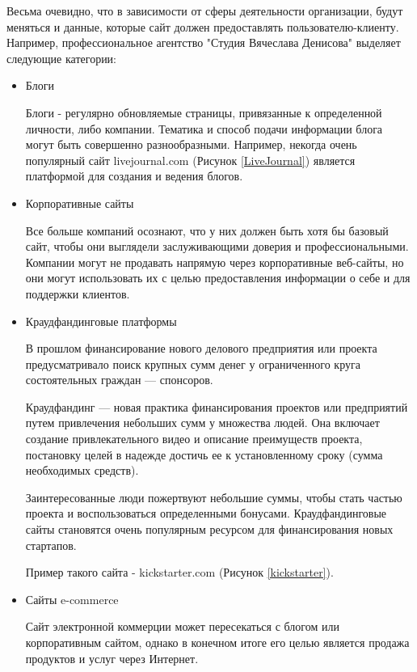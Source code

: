Весьма очевидно, что в зависимости от сферы деятельности организации, будут меняться и данные, которые сайт должен предоставлять пользователю-клиенту.
Например, профессиональное агентство "Студия Вячеслава Денисова" \cite{denisov} выделяет следующие категории:
\begin{itemize}
	\item Блоги
    
    Блоги - регулярно обновляемые страницы, привязанные к определенной личности, либо компании.
	Тематика и способ подачи информации блога могут быть совершенно разнообразными.
	Например, некогда очень популярный сайт livejournal.com \cite{livejournal} (Рисунок \ref{LiveJournal}) является платформой для создания и ведения блогов.

	\item Корпоративные сайты

	Все больше компаний осознают, что у них должен быть хотя бы базовый сайт, чтобы они выглядели заслуживающими доверия и профессиональными. Компании могут не продавать напрямую через корпоративные веб-сайты, но они могут использовать их с целью предоставления информации о себе и для поддержки клиентов.

	\item Краудфандинговые платформы

	В прошлом финансирование нового делового предприятия или проекта предусматривало поиск крупных сумм денег у ограниченного круга состоятельных граждан — спонсоров.

	Краудфандинг — новая практика финансирования проектов или предприятий путем привлечения небольших сумм у множества людей. Она включает создание привлекательного видео и описание преимуществ проекта, постановку целей в надежде достичь ее к установленному сроку (сумма необходимых средств).

	Заинтересованные люди пожертвуют небольшие суммы, чтобы стать частью проекта и воспользоваться определенными бонусами. Краудфандинговые сайты становятся очень популярным ресурсом для финансирования новых стартапов.

    Пример такого сайта - kickstarter.com \cite{kickstarter} (Рисунок \ref{kickstarter}).

	\item Сайты e-commerce

	Сайт электронной коммерции может пересекаться с блогом или корпоративным сайтом, однако в конечном итоге его целью является продажа продуктов и услуг через Интернет.


\end{itemize}
